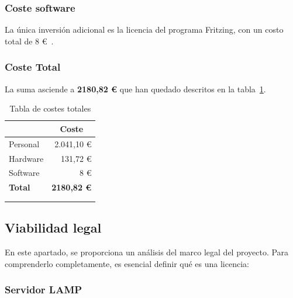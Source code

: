 \subsubsection{Coste software}
La única inversión adicional es la licencia del programa Fritzing, con un costo total de 8 €~\cite{misc:Fritzing}.


\subsubsection{Coste Total}
La suma asciende a \textbf{2180,82 €} que han quedado descritos en la tabla~\ref{tab:CosteTotal}.

\begin{longtable}[c]{@{}lr@{}}
\toprule
\centering
\multicolumn{1}{c}{\textbf{Concepto}} & \multicolumn{1}{c}{\textbf{Coste}} \\* \midrule
\endfirsthead
%
\endhead
%
\bottomrule
\endfoot
%
\endlastfoot
%
Personal & 2.041,10 € \\
Hardware & 131,72 € \\
Software & 8 € \\ \midrule

\textbf{Total} & \textbf{2180,82 €} \\ \bottomrule \\
\caption{Tabla de costes totales} 
\label{tab:CosteTotal}
\end{longtable}

\subsection{Viabilidad legal}
En este apartado, se proporciona un análisis del marco legal del proyecto. Para comprenderlo completamente, es esencial definir qué es una licencia:

\subsubsection{Servidor LAMP}

